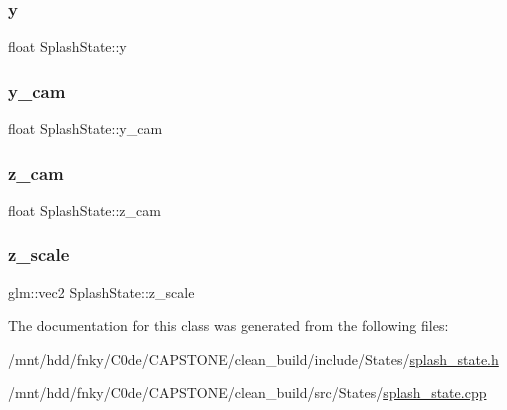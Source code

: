 \mbox{\label{classSplashState_a4477fcbed7b631aaf135359a09bb0b3c}} 
\subsubsection{\texorpdfstring{y}{y}}
{\footnotesize\ttfamily float Splash\+State\+::y\hspace{0.3cm}{\ttfamily [private]}}

\mbox{\label{classSplashState_adce1ee0219be0b1045a578c4cae88b3b}} 
\subsubsection{\texorpdfstring{y\+\_\+cam}{y\_cam}}
{\footnotesize\ttfamily float Splash\+State\+::y\+\_\+cam\hspace{0.3cm}{\ttfamily [private]}}

\mbox{\label{classSplashState_a4c2362acca2844d0cbcdc2fc958d68a6}} 
\subsubsection{\texorpdfstring{z\+\_\+cam}{z\_cam}}
{\footnotesize\ttfamily float Splash\+State\+::z\+\_\+cam\hspace{0.3cm}{\ttfamily [private]}}

\mbox{\label{classSplashState_aa80fb9876f76790eb989071b213c967f}} 
\subsubsection{\texorpdfstring{z\+\_\+scale}{z\_scale}}
{\footnotesize\ttfamily glm\+::vec2 Splash\+State\+::z\+\_\+scale\hspace{0.3cm}{\ttfamily [private]}}



The documentation for this class was generated from the following files\+:\begin{DoxyCompactItemize}
\item 
/mnt/hdd/fnky/\+C0de/\+C\+A\+P\+S\+T\+O\+N\+E/clean\+\_\+build/include/\+States/\hyperlink{splash__state_8h}{splash\+\_\+state.\+h}\item 
/mnt/hdd/fnky/\+C0de/\+C\+A\+P\+S\+T\+O\+N\+E/clean\+\_\+build/src/\+States/\hyperlink{splash__state_8cpp}{splash\+\_\+state.\+cpp}\end{DoxyCompactItemize}
